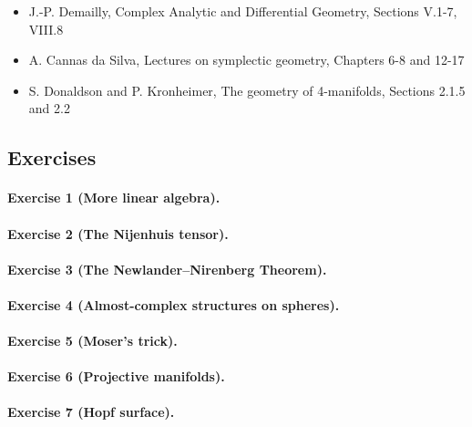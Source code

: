 \documentclass{article}
\theoremstyle{definition}
\begin{document}
\begin{itemize}
    \item J.-P. Demailly, Complex Analytic and Differential Geometry, Sections
        V.1-7, VIII.8

    \item A. Cannas da Silva, Lectures on symplectic geometry, Chapters 6-8 and
        12-17

    \item S. Donaldson and P. Kronheimer, The geometry of 4-manifolds, Sections
        2.1.5 and 2.2
\end{itemize}

\subsection*{Exercises}


\paragraph{Exercise 1 {\normalfont(More linear algebra)}.}

\paragraph{Exercise 2 {\normalfont(The Nijenhuis tensor)}.} 

\paragraph{Exercise 3 {\normalfont(The Newlander--Nirenberg Theorem)}.} 

\paragraph{Exercise 4 {\normalfont(Almost-complex structures on spheres)}.} 

\paragraph{Exercise 5 {\normalfont(Moser's trick)}.} 

\paragraph{Exercise 6 {\normalfont(Projective manifolds)}.} 

\paragraph{Exercise 7 {\normalfont(Hopf surface)}.} 
\end{document}

